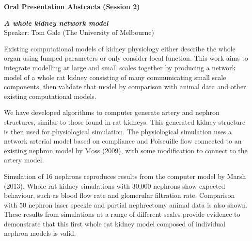 \documentclass[10pt,]{article}
\begin{document}
\vfill
\pagebreak
\null
\vfill

{\Large\bfseries\centering Oral Presentation Abstracts (Session 2)}\\[3ex]

\begin{minipage}[c]{\linewidth}
\raggedright
\small

\emph{\bfseries A whole kidney network model}\\
Speaker: Tom Gale (The University of Melbourne)\\[1ex]
{ \small
Existing computational models of kidney physiology either describe the whole
organ using lumped parameters or only consider local function. This work aims
to integrate modelling at large and small scales together by producing a
network model of a whole rat kidney consisting of many communicating small
scale components, then validate that model by comparison with animal data and
other existing computational models.

We have developed algorithms to computer generate artery and nephron
structures, similar to those found in rat kidneys. This generated kidney
structure is then used for physiological simulation. The physiological
simulation uses a network arterial model based on compliance and Poiseuille
flow connected to an existing nephron model by Moss (2009), with some
modification to connect to the artery model.

Simulation of 16 nephrons reproduces results from the computer model by Marsh
(2013). Whole rat kidney simulations with 30,000 nephrons show expected
behaviour, such as blood flow rate and glomerular filtration rate. Comparison
with 50 nephron laser speckle and partial nephrectomy animal data is also
shown. These results from simulations at a range of different scales provide
evidence to demonstrate that this first whole rat kidney model composed of
individual nephron models is valid.}

\vspace{3ex}


\end{minipage}
\end{document}
